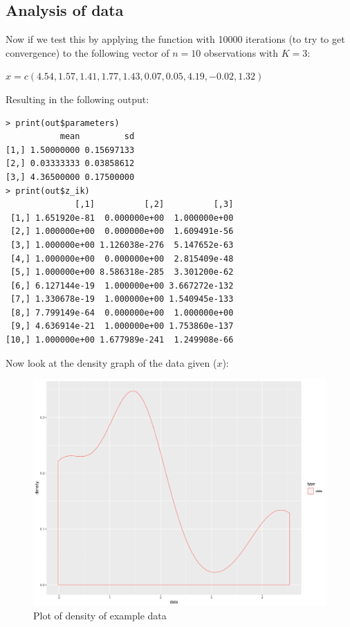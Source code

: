 \documentclass[12pt]{article}
\begin{document}
\subsection{Analysis of data}
Now if we test this by applying the function with 10000 iterations (to try to get convergence) to the following vector of $n = 10$ observations with $K = 3$: \par
$x = c(4.54,1.57,1.41,1.77,1.43,0.07,0.05,4.19,−0.02,1.32)$ \par
Resulting in the following output:
\begin{lstlisting}[caption={Complete R code output},label={R_complete_output}]
> print(out$parameters)
           mean         sd
[1,] 1.50000000 0.15697133
[2,] 0.03333333 0.03858612
[3,] 4.36500000 0.17500000
> print(out$z_ik)
              [,1]          [,2]          [,3]
 [1,] 1.651920e-81  0.000000e+00  1.000000e+00
 [2,] 1.000000e+00  0.000000e+00  1.609491e-56
 [3,] 1.000000e+00 1.126038e-276  5.147652e-63
 [4,] 1.000000e+00  0.000000e+00  2.815409e-48
 [5,] 1.000000e+00 8.586318e-285  3.301200e-62
 [6,] 6.127144e-19  1.000000e+00 3.667272e-132
 [7,] 1.330678e-19  1.000000e+00 1.540945e-133
 [8,] 7.799149e-64  0.000000e+00  1.000000e+00
 [9,] 4.636914e-21  1.000000e+00 1.753860e-137
[10,] 1.000000e+00 1.677989e-241  1.249908e-66
\end{lstlisting}
Now look at the density graph of the data given ($x$):
\begin{figure}[H]
    \centering
    \includegraphics[width=\textwidth]{DensityGraph.pdf}
    \caption{Plot of density of example data}
\end{figure}
\end{document}
